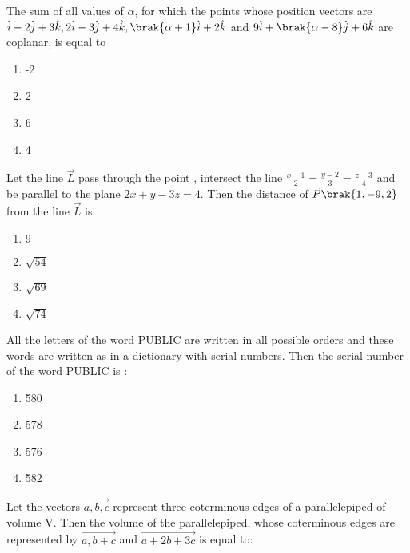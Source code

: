 \iffalse
\title{Assignment}
\author{EE24BTECH11047 - Niketh Prakash Achanta}
\section{mcq-single}
\fi
 \item The sum of all values of $\alpha$, for which the points whose position vectors are $\hat{i}-2\hat{j}+3\hat{k}, 2\hat{i}-3\hat{j}+4\hat{k}, \brak{\alpha+1}\hat{i}+2\hat{k}$ and $9\hat{i}+\brak{\alpha-8}\hat{j}+6\hat{k}$ are coplanar, is equal to 
    \begin{multicols}{4}
    \begin{enumerate}
        \item -2
        \item 2
        \item 6
        \item 4
    \end{enumerate}
    \end{multicols}
\item Let the line $\vec{L}$ pass through the point , intersect the line $\frac{x-1}{2}=\frac{y-2}{3}=\frac{z-3}{4}$ and be parallel to the plane $2x+y-3z=4$. Then the distance of $\vec{P}\brak{1,-9,2}$ from the line $\vec{L}$ is 
    \begin{multicols}{4}
    \begin{enumerate}
        \item $9$
        \item $\sqrt{54}$
        \item $\sqrt{69}$
        \item $\sqrt{74}$
    \end{enumerate} 
    \end{multicols}
\item All the letters of the word PUBLIC are written in all possible orders and these words are written as in a dictionary with serial numbers. Then the serial number of the word PUBLIC is :   
    \begin{multicols}{4}
    \begin{enumerate}
        \item 580
        \item 578
        \item 576
        \item 582
    \end{enumerate} 
    \end{multicols}
\item Let the vectors $\vec{a,b,c}$ represent three coterminous edges of a parallelepiped of volume V. Then the volume of the parallelepiped, whose coterminous edges are represented by $\vec{a,b+c}$ and $\vec{a+2b+3c}$ is equal to: 
